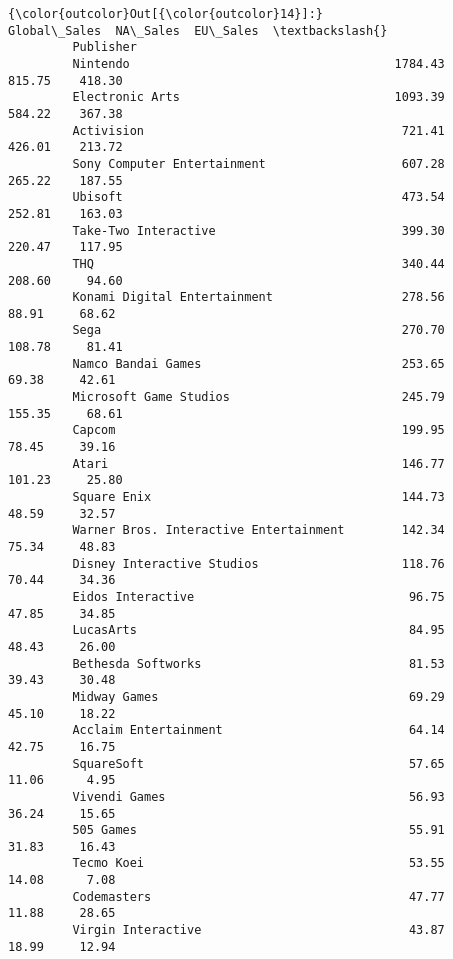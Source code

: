 \documentclass[11pt]{article}
\begin{document}
\begin{Verbatim}[commandchars=\\\{\}]
{\color{outcolor}Out[{\color{outcolor}14}]:}                                         Global\_Sales  NA\_Sales  EU\_Sales  \textbackslash{}
         Publisher                                                                  
         Nintendo                                     1784.43    815.75    418.30   
         Electronic Arts                              1093.39    584.22    367.38   
         Activision                                    721.41    426.01    213.72   
         Sony Computer Entertainment                   607.28    265.22    187.55   
         Ubisoft                                       473.54    252.81    163.03   
         Take-Two Interactive                          399.30    220.47    117.95   
         THQ                                           340.44    208.60     94.60   
         Konami Digital Entertainment                  278.56     88.91     68.62   
         Sega                                          270.70    108.78     81.41   
         Namco Bandai Games                            253.65     69.38     42.61   
         Microsoft Game Studios                        245.79    155.35     68.61   
         Capcom                                        199.95     78.45     39.16   
         Atari                                         146.77    101.23     25.80   
         Square Enix                                   144.73     48.59     32.57   
         Warner Bros. Interactive Entertainment        142.34     75.34     48.83   
         Disney Interactive Studios                    118.76     70.44     34.36   
         Eidos Interactive                              96.75     47.85     34.85   
         LucasArts                                      84.95     48.43     26.00   
         Bethesda Softworks                             81.53     39.43     30.48   
         Midway Games                                   69.29     45.10     18.22   
         Acclaim Entertainment                          64.14     42.75     16.75   
         SquareSoft                                     57.65     11.06      4.95   
         Vivendi Games                                  56.93     36.24     15.65   
         505 Games                                      55.91     31.83     16.43   
         Tecmo Koei                                     53.55     14.08      7.08   
         Codemasters                                    47.77     11.88     28.65   
         Virgin Interactive                             43.87     18.99     12.94   

\end{Verbatim}
\end{document}
